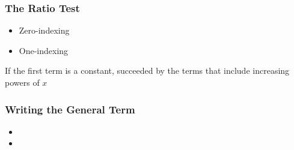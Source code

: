 \documentclass{beamer}
\begin{document}
\begin{frame}
\frametitle{The Ratio Test}

\begin{itemize}
\item Zero-indexing
\item One-indexing
\end{itemize}
If the first term is a constant, succeeded by the terms that include increasing powers of $x$
\end{frame}
\begin{frame}
\frametitle{Writing the General Term}
\begin{itemize}
\item
\item
\end{itemize}
\end{frame}
\end{document}
